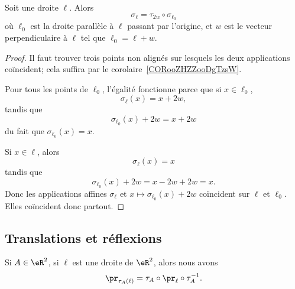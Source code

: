 \begin{lemma}   \label{LEMooVOJLooCFgdNG}
	Soit une droite \( \ell\). Alors
	\begin{equation}
		\sigma_{\ell}=\tau_{2w}\circ\sigma_{\ell_0}
	\end{equation}
	où \( \ell_0\) est la droite parallèle à \( \ell\) passant par l'origine, et \( w\) est le vecteur perpendiculaire à \( \ell\) tel que \( \ell_0=\ell+w\).
\end{lemma}

\begin{proof}
	Il faut trouver trois points non alignés sur lesquels les deux applications coïncident; cela suffira par le corolaire~\ref{CORooZHZZooDgTzsW}.

	Pour tous les points de \( \ell_0\), l'égalité fonctionne parce que si \( x\in\ell_0\),
	\begin{equation}
		\sigma_{\ell}(x)=x+2w,
	\end{equation}
	tandis que
	\begin{equation}
		\sigma_{\ell_0}(x)+2w=x+2w
	\end{equation}
	du fait que \( \sigma_{\ell_0}(x)=x\).

	Si \( x\in\ell\), alors
	\begin{equation}
		\sigma_{\ell}(x)=x
	\end{equation}
	tandis que
	\begin{equation}
		\sigma_{\ell_0}(x)+2w=x-2w+2w=x.
	\end{equation}
	Donc les applications affines \( \sigma_{\ell}\) et \( x\mapsto \sigma_{\ell_0}(x)+2w\) coïncident sur \( \ell\) et \( \ell_0\). Elles coïncident donc partout.
\end{proof}

\subsection{Translations et réflexions}

\begin{lemma}       \label{LEMooMKTXooYKZcdQ}
	Si \( A\in \eR^2\), si \( \ell\) est une droite de \( \eR^2\), alors nous avons
	\begin{equation}
		\pr_{\tau_A(\ell)}=\tau_A\circ \pr_{\ell}\circ\tau_A^{-1}.
	\end{equation}
\end{lemma}

